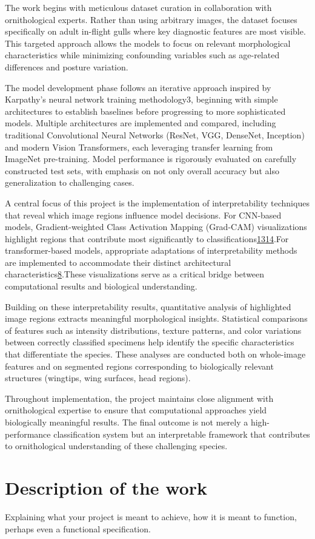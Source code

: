The work begins with meticulous dataset curation in collaboration with ornithological experts. Rather than using arbitrary images, the dataset focuses specifically on adult in-flight gulls where key diagnostic features are most visible. This targeted approach allows the models to focus on relevant morphological characteristics while minimizing confounding variables such as age-related differences and posture variation.

The model development phase follows an iterative approach inspired by Karpathy's neural network training methodology3, beginning with simple architectures to establish baselines before progressing to more sophisticated models. Multiple architectures are implemented and compared, including traditional Convolutional Neural Networks (ResNet, VGG, DenseNet, Inception) and modern Vision Transformers, each leveraging transfer learning from ImageNet pre-training. Model performance is rigorously evaluated on carefully constructed test sets, with emphasis on not only overall accuracy but also generalization to challenging cases.

A central focus of this project is the implementation of interpretability techniques that reveal which image regions influence model decisions. For CNN-based models, Gradient-weighted Class Activation Mapping (Grad-CAM) visualizations highlight regions that contribute most significantly to classifications\href{https://www.semanticscholar.org/paper/c06c7104f697357250a55330142990991d9be0a5}{13}\href{https://www.semanticscholar.org/paper/a6268ed45e5b3fc48d5f8621c5e3e997cb6ba3f8}{14}.For transformer-based models, appropriate adaptations of interpretability methods are implemented to accommodate their distinct architectural characteristics\href{https://www.semanticscholar.org/paper/0305f297150c358875aa796e05e9d79231c03eaf}{8}.These visualizations serve as a critical bridge between computational results and biological understanding.

Building on these interpretability results, quantitative analysis of highlighted image regions extracts meaningful morphological insights. Statistical comparisons of features such as intensity distributions, texture patterns, and color variations between correctly classified specimens help identify the specific characteristics that differentiate the species. These analyses are conducted both on whole-image features and on segmented regions corresponding to biologically relevant structures (wingtips, wing surfaces, head regions).

Throughout implementation, the project maintains close alignment with ornithological expertise to ensure that computational approaches yield biologically meaningful results. The final outcome is not merely a high-performance classification system but an interpretable framework that contributes to ornithological understanding of these challenging species.




\section{Description of the work}

Explaining what your project is meant to achieve, how it is meant to function, perhaps even a functional specification.


